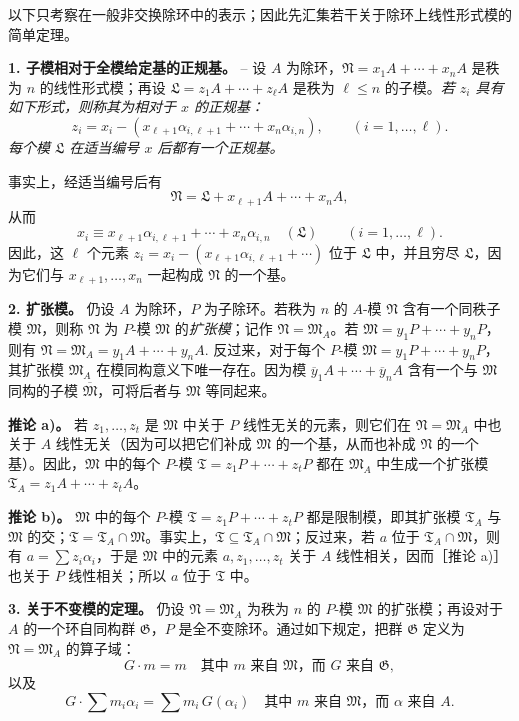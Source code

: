 \documentclass[11pt]{article}
\providecommand{\frT}{\mathfrak T}
\providecommand{\frM}{\mathfrak M}
\providecommand{\frN}{\mathfrak N}
\providecommand{\frG}{\mathfrak G}
\providecommand{\frL}{\mathfrak L}
\begin{document}
以下只考察在一般非交换除环中的表示；因此先汇集若干关于除环上线性形式模的简单定理。

\noindent\textbf{1. 子模相对于全模给定基的正规基。} -- 设 \(A\) 为除环，\(\frN=x_1A+\cdots+x_nA\) 是秩为 \(n\) 的线性形式模；再设 \(\frL=z_1A+\cdots+z_\ell A\) 是秩为 \(\ell\le n\) 的子模。\emph{若 \(z_i\) 具有如下形式，则称其为相对于 \(x\) 的正规基：}
\[
        z_i=x_i-(x_{\ell+1}\alpha_{i,\ell+1}+\cdots+x_n\alpha_{i,n}),
        \qquad (i=1,\ldots,\ell).
\]
\emph{每个模 \(\frL\) 在适当编号 \(x\) 后都有一个正规基。}

事实上，经适当编号后有
\[
        \frN=\frL+x_{\ell+1}A+\cdots+x_nA,
\]
从而
\[
        x_i\equiv x_{\ell+1}\alpha_{i,\ell+1}+\cdots+x_n\alpha_{i,n}
        \quad(\frL)\qquad (i=1,\ldots,\ell). \tag{2}
\]
因此，这 \(\ell\) 个元素 \(z_i=x_i-(x_{\ell+1}\alpha_{i,\ell+1}+\cdots)\) 位于 \(\frL\) 中，并且穷尽 \(\frL\)，因为它们与 \(x_{\ell+1},\ldots,x_n\) 一起构成 \(\frN\) 的一个基。

\noindent\textbf{2. 扩张模。} 仍设 \(A\) 为除环，\(P\) 为子除环。若秩为 \(n\) 的 \(A\)-模 \(\frN\) 含有一个同秩子模 \(\frM\)，则称 \(\frN\) 为 \(P\)-模 \(\frM\) 的\emph{扩张模}；记作 \(\frN=\frM_A\)。若 \(\frM=y_1P+\cdots+y_nP\)，则有 \(\frN=\frM_A=y_1A+\cdots+y_nA.\) 反过来，对于每个 \(P\)-模 \(\frM=y_1P+\cdots+y_nP\)，其扩张模 \(\frM_A\) 在模同构意义下唯一存在。因为模 \(\overline y_1A+\cdots+\overline y_nA\) 含有一个与 \(\frM\) 同构的子模 \(\overline{\frM}\)，可将后者与 \(\frM\) 等同起来。

\noindent\textbf{推论 a)。} 若 \(z_1,\ldots,z_t\) 是 \(\frM\) 中关于 \(P\) 线性无关的元素，则它们在 \(\frN=\frM_A\) 中也关于 \(A\) 线性无关（因为可以把它们补成 \(\frM\) 的一个基，从而也补成 \(\frN\) 的一个基）。因此，\(\frM\) 中的每个 \(P\)-模 \(\frT=z_1P+\cdots+z_tP\) 都在 \(\frM_A\) 中生成一个扩张模 \(\frT_A=z_1A+\cdots+z_tA\)。

\noindent\textbf{推论 b)。} \(\frM\) 中的每个 \(P\)-模 \(\frT=z_1P+\cdots+z_tP\) 都是限制模，即其扩张模 \(\frT_A\) 与 \(\frM\) 的交；\(\frT=\frT_A\cap\frM\)。事实上，\(\frT\subseteq \frT_A\cap\frM\)；反过来，若 \(a\) 位于 \(\frT_A\cap\frM\)，则有 \(a=\sum z_i\alpha_i\)，于是 \(\frM\) 中的元素 \(a,z_1,\ldots,z_t\) 关于 \(A\) 线性相关，因而［推论 a)］也关于 \(P\) 线性相关；所以 \(a\) 位于 \(\frT\) 中。

\noindent\textbf{3. 关于不变模的定理。} 仍设 \(\frN=\frM_A\) 为秩为 \(n\) 的 \(P\)-模 \(\frM\) 的扩张模；再设对于 \(A\) 的一个环自同构群 \(\frG\)，\(P\) 是全不变除环。通过如下规定，把群 \(\frG\) 定义为 \(\frN=\frM_A\) 的算子域：
\[
        G\cdot m=m\quad\text{其中 }m\text{ 来自 }\frM\text{，而 }G\text{ 来自 }\frG,
\]
以及
\[
        G\cdot\sum m_i\alpha_i=\sum m_i\,G(\alpha_i)
        \quad\text{其中 }m\text{ 来自 }\frM\text{，而 }\alpha\text{ 来自 }A.
\]
\end{document}
